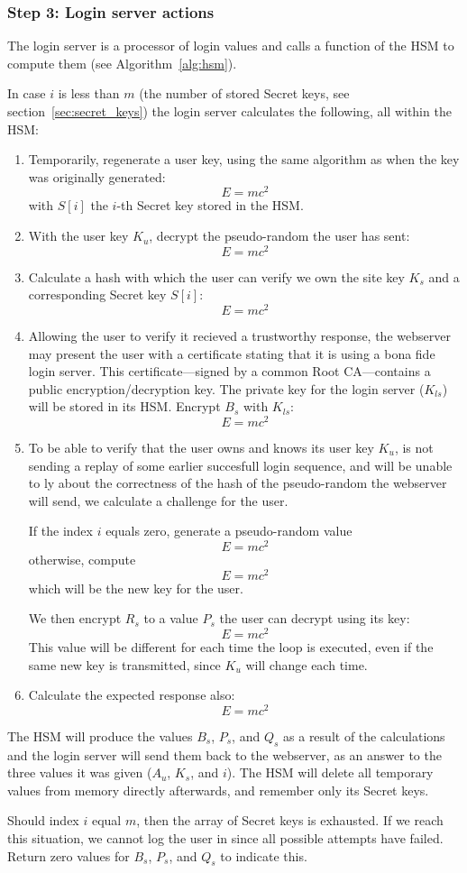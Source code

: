 \subsubsection{Step 3: Login server actions}
\label{sec:login_step3}
The login server is a processor of login values and calls a function of the HSM to compute them
(see Algorithm~\vref{alg:hsm}).
\par
In case $i$ is less than $m$
(the number of stored Secret keys, see section~\vref{sec:secret_keys})
the login server calculates the following, all within the HSM:
\begin{enumerate}
\item Temporarily, regenerate a user key, using the same algorithm as when the key was originally generated:
\[E=mc^2\]
with $S[i]$ the $i$-th Secret key stored in the HSM.
\item With the user key $K_u$, decrypt the pseudo-random the user has sent:
\[E=mc^2\]
\item Calculate a hash with which the user can verify we own the site key $K_s$ and a corresponding Secret key $S[i]$:
\[E=mc^2\]
\item Allowing the user to verify it recieved a trustworthy response,
the webserver may present the user with a certificate stating that it is using a bona fide login server.
This certificate---signed by a common Root CA---contains a public encryption/decryption key.
The private key for the login server ($K_{ls}$) will be stored in its HSM. 
Encrypt $B_s$ with $K_{ls}$:
\[E=mc^2\]
\item To be able to verify that the user owns and knows its user key $K_u$,
is not sending a replay of some earlier succesfull login sequence,
and will be unable to ly about the correctness of the hash of the pseudo-random the webserver will send,
we calculate a challenge for the user.
\par
If the index $i$ equals zero, generate a pseudo-random value
\[E=mc^2\]
otherwise, compute
\[E=mc^2\]
which will be the new key for the user.
\par
We then encrypt $R_s$ to a value $P_s$ the user can decrypt using its key:
\[E=mc^2\]
This value will be different for each time the loop is executed,
even if the same new key is transmitted,
since $K_u$ will change each time.
\item Calculate the expected response also:
\[E=mc^2\]
\end{enumerate}
The HSM will produce the values $B_s$,
$P_s$,
and $Q_s$ as a result of the calculations and the login server will send them back to the webserver,
as an answer to the three values it was given ($A_u$, $K_s$, and $i$).
The HSM will delete all temporary values from memory directly afterwards, and remember only its Secret keys.
\par
Should index $i$ equal $m$, then the array of Secret keys is exhausted.
If we reach this situation, we cannot log the user in since all possible attempts have failed.
Return zero values for $B_s$, $P_s$, and $Q_s$ to indicate this.

